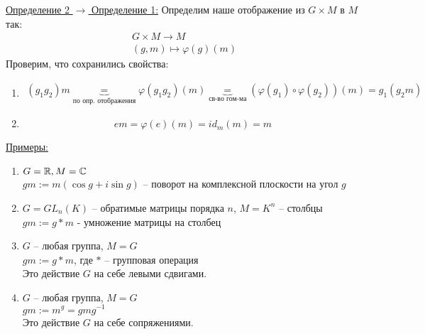 \underline{Определение 2 $\to$ Определение 1:} Определим наше отображение из $G \times M$ в $M$ так:
\begin{gather*}
    G \times M \to M \\
    (g, m) \mapsto \varphi(g)(m)
\end{gather*}
Проверим, что сохранились свойства:
\begin{enumerate}
    \item \begin{gather*}
        (g_1g_2)m \underbrace{=}_{\text{по опр. отображения}} \varphi(g_1g_2)(m) \underbrace{=}_{\text{св-во гом-ма}} (\varphi(g_1) \circ \varphi(g_2))(m) = g_1(g_2m)
    \end{gather*}
    \item \[ em = \varphi(e)(m) = id_m(m) = m \]
\end{enumerate}

\underline{Примеры:}
\begin{enumerate}
    \item $G = \mathbb{R}, M = \mathbb{C}$ \\ $gm := m(\cos g + i\sin g)$ -- поворот на комплексной плоскости на угол $g$
    \item $G = GL_n(K)$ -- обратимые матрицы порядка $n$, $M = K^n$ -- столбцы \\ $gm := g * m$ - умножение матрицы на столбец
    \item $G$ -- любая группа, $M = G$ \\ $gm := g * m$, где $*$ -- групповая операция \\ Это действие $G$ на себе левыми сдвигами.
    \item $G$ -- любая группа, $M = G$ \\ $gm := m^g = gmg^{-1}$ \\ Это действие $G$ на себе сопряжениями.
\end{enumerate}